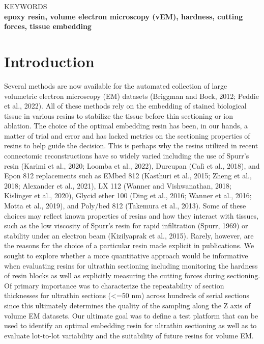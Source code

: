 \documentclass{article}
\begin{document}
\noindent KEYWORDS\\
\textbf{epoxy resin, volume electron microscopy (vEM), hardness, cutting forces, tissue embedding}

\section*{Introduction}

Several methods are now available for the automated collection of large volumetric electron microscopy (EM) datasets (Briggman and Bock, 2012; Peddie et al., 2022). All of these methods rely on the embedding of stained biological tissue in various resins to stabilize the tissue before thin sectioning or ion ablation. The choice of the optimal embedding resin has been, in our hands, a matter of trial and error and has lacked metrics on the sectioning properties of resins to help guide the decision. This is perhaps why the resins utilized in recent connectomic reconstructions have so widely varied including the use of Spurr’s resin (Karimi et al., 2020; Loomba et al., 2022), Durcupan (Calì et al., 2018), and Epon 812 replacements such as EMbed 812 (Kasthuri et al., 2015; Zheng et al., 2018; Alexander et al., 2021), LX 112 (Wanner and Vishwanathan, 2018; Kislinger et al., 2020), Glycid ether 100 (Ding et al., 2016; Wanner et al., 2016; Motta et al., 2019), and Poly/bed 812 (Takemura et al., 2013). Some of these choices may reflect known properties of resins and how they interact with tissues, such as the low viscosity of Spurr’s resin for rapid infiltration (Spurr, 1969) or stability under an electron beam (Kizilyaprak et al., 2015). Rarely, however, are the reasons for the choice of a particular resin made explicit in publications. We sought to explore whether a more quantitative approach would be informative when evaluating resins for ultrathin sectioning including monitoring the hardness of resin blocks as well as explicitly measuring the cutting forces during sectioning. Of primary importance was to characterize the repeatability of section thicknesses for ultrathin sections (<=50 nm) across hundreds of serial sections since this ultimately determines the quality of the sampling along the Z axis of volume EM datasets. Our ultimate goal was to define a test platform that can be used to identify an optimal embedding resin for ultrathin sectioning as well as to evaluate lot-to-lot variability and the suitability of future resins for volume EM.
\end{document}
